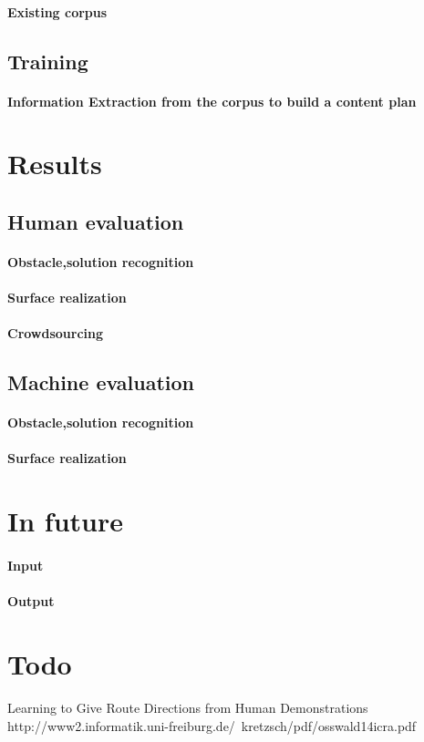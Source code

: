 \documentclass{article}
\begin{document}
				\paragraph{Existing corpus}
		\subsection{Training}
			\paragraph{Information Extraction from the corpus to build a content plan}
		\section{Results}
			\subsection{Human evaluation}
				\paragraph{Obstacle,solution recognition}
				\paragraph{Surface realization}
				\paragraph{Crowdsourcing}
			\subsection{Machine evaluation}
				\paragraph{Obstacle,solution recognition}
				\paragraph{Surface realization}
		\section{In future}
			\paragraph{Input}
			\paragraph{Output}
			
		\section{Todo}
		\begin{thebibliography}{9}
			Learning to Give Route Directions from Human Demonstrations http://www2.informatik.uni-freiburg.de/~kretzsch/pdf/osswald14icra.pdf
		\end{thebibliography}
\end{document}
